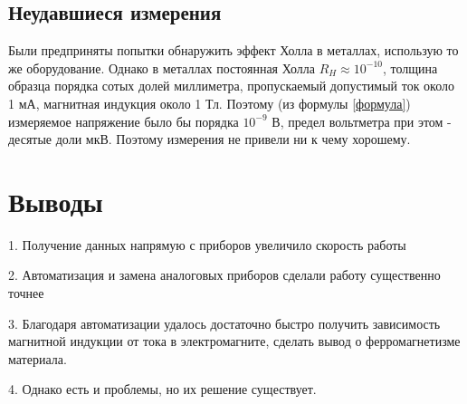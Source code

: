 \documentclass[a4paper,12pt]{article} %
\begin{document}
\subsection*{Неудавшиеся измерения}
Были предприняты попытки обнаружить эффект Холла в металлах, использую то же оборудование. Однако в металлах постоянная Холла $R_H \approx 10^{-10}$, толщина образца порядка сотых долей миллиметра, пропускаемый допустимый ток около 1 мА, магнитная индукция около 1 Тл. Поэтому (из формулы \ref{формула}) измеряемое напряжение было бы порядка $10^{-9}$ В, предел вольтметра при этом - десятые доли мкВ. Поэтому измерения не привели ни к чему хорошему.


\section{Выводы}

\hspace{5mm} 1. Получение данных напрямую с приборов  увеличило скорость работы

2. Автоматизация и замена аналоговых приборов сделали работу существенно точнее

3. Благодаря автоматизации удалось достаточно быстро получить зависимость магнитной индукции от тока в электромагните, сделать вывод о ферромагнетизме материала.

4. Однако есть и проблемы, но их решение существует.
\end{document}
